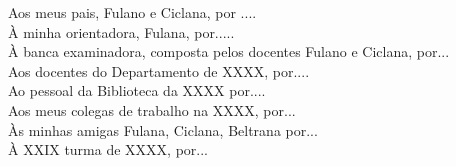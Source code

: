 %
%
\begin{agradecimentos}

\noindent
Aos meus pais, Fulano e Ciclana, por ....\\

\noindent
À minha orientadora, Fulana, por.....\\

\noindent
À banca examinadora, composta pelos docentes Fulano e Ciclana, por...\\

\noindent
Aos docentes do Departamento de XXXX,  por....\\

\noindent
Ao pessoal da Biblioteca da XXXX  por....\\

\noindent
Aos meus colegas de trabalho na XXXX, por...\\

\noindent
Às minhas amigas  Fulana, Ciclana, Beltrana por...\\

\noindent
À XXIX turma de XXXX, por...
\end{agradecimentos}
